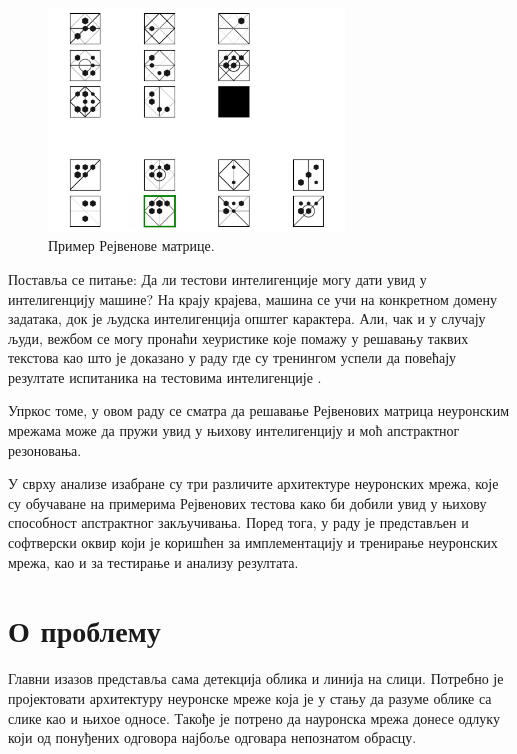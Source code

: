 \documentclass[a4paper, 12pt, master, utf8]{etf}
\begin{document}
\begin{figure}[h]
    \centering
    \includegraphics[width=0.7\textwidth]{images/output.png}
    \caption{Пример Рејвенове матрице.}
    \label{fig:raven_example}
\end{figure}

Поставља се питање: Да ли тестови интелигенције могу дати увид у интелигенцију машине? На крају 
крајева, машина се учи на конкретном домену задатака, док је људска интелигенција општег карактера. 
Али, чак и у случају људи, вежбом се могу пронаћи хеуристике које помажу у решавању таквих текстова као 
што је доказано у раду где су тренингом успели да повећају резултате испитаника на тестовима интелигенције \cite{te2001practice}.
\newline

Упркос томе, у овом раду се сматра да решавање Рејвенових матрица неуронским мрежама може да пружи увид у њихову интелигенцију и моћ апстрактног резоновања. 
\newline

У сврху анализе изабране су три различите архитектуре неуронских мрежа, које су обучаване на примерима Рејвенових тестова како би добили увид у њихову способност апстрактног закључивања.
Поред тога, у раду је представљен и софтверски оквир који је коришћен за имплементацију и тренирање неуронских мрежа, као и за тестирање и анализу резултата. 

\chapter{О проблему}
\label{sec:2}

Главни изазов представља сама детекција облика и линија на слици. Потребно је пројектовати архитектуру неуронске мреже која је у стању да разуме облике
са слике као и њихое односе. Такође је потрено да науронска мрежа донесе одлуку који од понуђених одговора најбоље одговара непознатом обрасцу.
\newline
\end{document}
